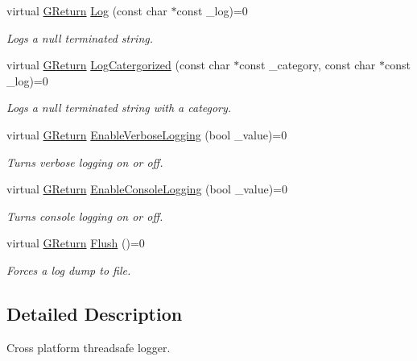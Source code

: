\begin{DoxyCompactItemize}
\item 
virtual \mbox{\hyperlink{namespaceGW_a67a839e3df7ea8a5c5686613a7a3de21}{G\+Return}} \mbox{\hyperlink{classGW_1_1SYSTEM_1_1GLog_a9e21e702d012065fe799b4c49f7ac670}{Log}} (const char $\ast$const \+\_\+log)=0
\begin{DoxyCompactList}\small\item\em Logs a null terminated string. \end{DoxyCompactList}\item 
virtual \mbox{\hyperlink{namespaceGW_a67a839e3df7ea8a5c5686613a7a3de21}{G\+Return}} \mbox{\hyperlink{classGW_1_1SYSTEM_1_1GLog_a5d10397fa6aeeebaf8430df6029ec3c5}{Log\+Catergorized}} (const char $\ast$const \+\_\+category, const char $\ast$const \+\_\+log)=0
\begin{DoxyCompactList}\small\item\em Logs a null terminated string with a category. \end{DoxyCompactList}\item 
virtual \mbox{\hyperlink{namespaceGW_a67a839e3df7ea8a5c5686613a7a3de21}{G\+Return}} \mbox{\hyperlink{classGW_1_1SYSTEM_1_1GLog_adea469091bba33b419f7e88a9c2c3049}{Enable\+Verbose\+Logging}} (bool \+\_\+value)=0
\begin{DoxyCompactList}\small\item\em Turns verbose logging on or off. \end{DoxyCompactList}\item 
virtual \mbox{\hyperlink{namespaceGW_a67a839e3df7ea8a5c5686613a7a3de21}{G\+Return}} \mbox{\hyperlink{classGW_1_1SYSTEM_1_1GLog_a1eb651aa3d5b6b8baac389be284a569d}{Enable\+Console\+Logging}} (bool \+\_\+value)=0
\begin{DoxyCompactList}\small\item\em Turns console logging on or off. \end{DoxyCompactList}\item 
virtual \mbox{\hyperlink{namespaceGW_a67a839e3df7ea8a5c5686613a7a3de21}{G\+Return}} \mbox{\hyperlink{classGW_1_1SYSTEM_1_1GLog_a07147c15ecb17caa1c83974b3c54f7d4}{Flush}} ()=0
\begin{DoxyCompactList}\small\item\em Forces a log dump to file. \end{DoxyCompactList}\end{DoxyCompactItemize}


\subsection{Detailed Description}
Cross platform threadsafe logger. 

